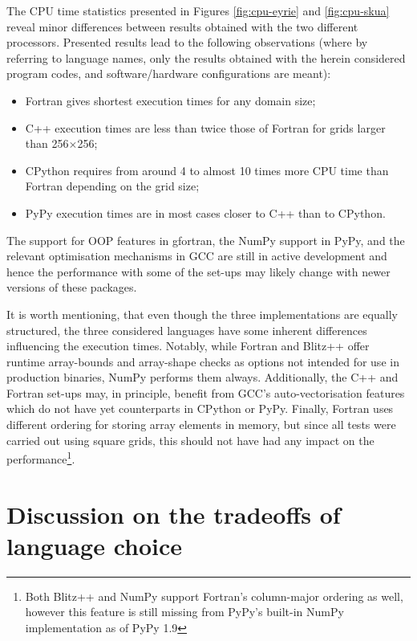 \documentclass[gmd]{copernicus}%
\begin{document}
  The CPU time statistics presented in Figures \ref{fig:cpu-eyrie} and \ref{fig:cpu-skua} reveal
    minor differences between results obtained with the two different processors.
  Presented results lead to the following observations
    (where by referring to language names, only the results obtained with the herein considered
     program codes, and software/hardware configurations are meant):
  \begin{itemize}
    \item{Fortran gives shortest execution times for any domain size;}
    \item{C++ execution times are less than twice those of Fortran for grids larger than 
      256$\times$256;}
    \item{CPython requires from around 4 to almost 10 times more CPU time than Fortran depending on the grid size;}
    \item{PyPy execution times are in most cases closer to C++ than to CPython.}
  \end{itemize}
  The support for OOP features in gfortran, the NumPy support in PyPy, and the relevant optimisation
    mechanisms in GCC are still in active development and hence the performance with some of the set-ups may 
    likely change with newer versions of these packages. 

  It is worth mentioning, that even though the three implementations are equally structured,
    the three considered languages have some inherent differences influencing the execution times.
  Notably, while Fortran and Blitz++ offer runtime array-bounds and array-shape checks as options
    not intended for use in production binaries, NumPy performs them always.
  Additionally, the C++ and Fortran set-ups may, in principle, benefit from GCC's auto-vectorisation
    features which do not have yet counterparts in CPython or PyPy.
  Finally, Fortran uses different ordering for storing array elements in memory, but since
    all tests were carried out using square grids, this should not have had any impact on the
    performance\footnote{Both Blitz++ and NumPy support Fortran's column-major ordering as well, 
    however this feature is still missing from PyPy's built-in NumPy implementation as of PyPy 1.9}.

  \section{Discussion on the tradeoffs of language choice}
\end{document}
